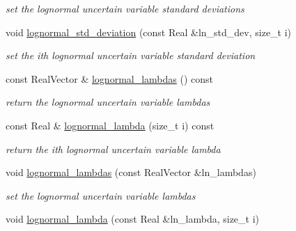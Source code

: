 \begin{DoxyCompactItemize}
\begin{DoxyCompactList}\small\item\em set the lognormal uncertain variable standard deviations \end{DoxyCompactList}\item 
void \hyperlink{classPecos_1_1AleatoryDistParams_a4ae7189fc3a20bf5cba8a4e1a8671def}{lognormal\+\_\+std\+\_\+deviation} (const Real \&ln\+\_\+std\+\_\+dev, size\+\_\+t i)\label{classPecos_1_1AleatoryDistParams_a4ae7189fc3a20bf5cba8a4e1a8671def}

\begin{DoxyCompactList}\small\item\em set the ith lognormal uncertain variable standard deviation \end{DoxyCompactList}\item 
const Real\+Vector \& \hyperlink{classPecos_1_1AleatoryDistParams_abdd670d2713dd972e44f94a661840810}{lognormal\+\_\+lambdas} () const \label{classPecos_1_1AleatoryDistParams_abdd670d2713dd972e44f94a661840810}

\begin{DoxyCompactList}\small\item\em return the lognormal uncertain variable lambdas \end{DoxyCompactList}\item 
const Real \& \hyperlink{classPecos_1_1AleatoryDistParams_a9e07d5cd2e5e0a2242d8bab0e174971a}{lognormal\+\_\+lambda} (size\+\_\+t i) const \label{classPecos_1_1AleatoryDistParams_a9e07d5cd2e5e0a2242d8bab0e174971a}

\begin{DoxyCompactList}\small\item\em return the ith lognormal uncertain variable lambda \end{DoxyCompactList}\item 
void \hyperlink{classPecos_1_1AleatoryDistParams_a3faed1525166cfc93a21861daf088b0b}{lognormal\+\_\+lambdas} (const Real\+Vector \&ln\+\_\+lambdas)\label{classPecos_1_1AleatoryDistParams_a3faed1525166cfc93a21861daf088b0b}

\begin{DoxyCompactList}\small\item\em set the lognormal uncertain variable lambdas \end{DoxyCompactList}\item 
void \hyperlink{classPecos_1_1AleatoryDistParams_a5bfc6b0458673c559f1c4e5fed4b45e3}{lognormal\+\_\+lambda} (const Real \&ln\+\_\+lambda, size\+\_\+t i)\label{classPecos_1_1AleatoryDistParams_a5bfc6b0458673c559f1c4e5fed4b45e3}


\end{DoxyCompactItemize}
